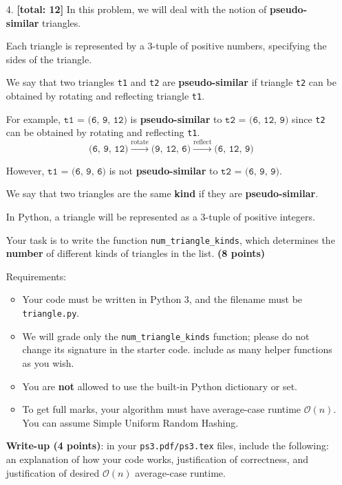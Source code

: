 \documentclass{assignment-263}
\begin{document}
\begin{enumerate}
  

\program

\item[4.] \textbf{[total: 12]}
  In this problem, we will deal with the notion
  of \textbf{pseudo-similar} triangles.

  Each triangle is represented by a 3-tuple of positive numbers,
  specifying the sides of the triangle.

  We say that two triangles \texttt{t1} and \texttt{t2} are
  \textbf{pseudo-similar} if triangle \texttt{t2} can be obtained by
  rotating and reflecting triangle \texttt{t1}.

  For example, $\texttt{t1 = (6, 9, 12)}$ is \textbf{pseudo-similar}
  to $\texttt{t2 = (6, 12, 9)}$ since \texttt{t2} can be obtained by
  rotating and reflecting \texttt{t1}.
%
  \[ \texttt{(6, 9, 12)}
    \xrightarrow{\text{rotate}} \texttt{(9, 12, 6)}
    \xrightarrow{\text{reflect}} \texttt{(6, 12, 9)}
  \]

  However, $\texttt{t1 = (6, 9, 6)}$ is not \textbf{pseudo-similar} to
  $\texttt{t2 = (6, 9, 9)}.$

  We say that two triangles are the same {\bf kind} if they are
  \textbf{pseudo-similar}.

  In Python, a triangle will be represented as a 3-tuple of positive
  integers.

  Your task is to write the function \verb|num_triangle_kinds|, which
  determines the \textbf{number} of different kinds of triangles in
  the list. \textbf{(8 points)}


Requirements:
\begin{itemize}
\item Your code must be written in Python 3, and the filename must be \verb|triangle.py|.
\item We will grade only the \verb|num_triangle_kinds| function; please do not change its signature in the starter code. include as many helper functions as you wish.
   \item You are {\bf not} allowed to use the built-in Python
			dictionary or set.
			\item To get full marks, your algorithm must have average-case runtime
				$\mathcal{O}(n)$. You can assume Simple Uniform Random Hashing.
   \end{itemize}

\textbf{Write-up (4 points)}: in your \verb|ps3.pdf/ps3.tex| files, include the following: an explanation of how your code works, justification of correctness, and
 justification of desired $\mathcal{O}(n)$ average-case runtime.

 \end{enumerate}
\end{document}
